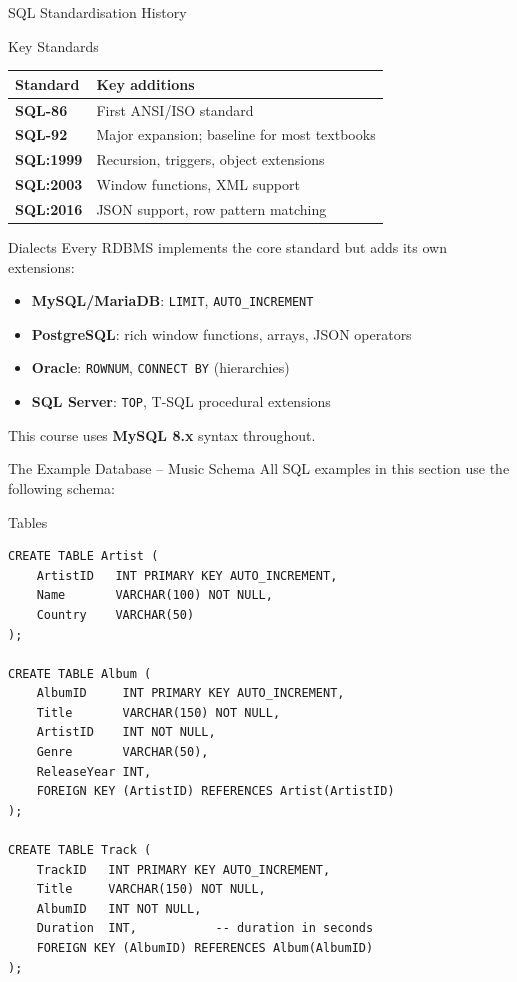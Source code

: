\begin{frame}{SQL Standardisation History}
  \begin{block}{Key Standards}
    \begin{tabular}{@{}ll@{}}
      \toprule
      \textbf{Standard} & \textbf{Key additions} \\
      \midrule
      \textbf{SQL-86}   & First ANSI/ISO standard \\
      \textbf{SQL-92}   & Major expansion; baseline for most textbooks \\
      \textbf{SQL:1999} & Recursion, triggers, object extensions \\
      \textbf{SQL:2003} & Window functions, XML support \\
      \textbf{SQL:2016} & JSON support, row pattern matching \\
      \bottomrule
    \end{tabular}
  \end{block}

  \begin{block}{Dialects}
    Every RDBMS implements the core standard but adds its own extensions:
    \begin{itemize}
      \item \textbf{MySQL/MariaDB}: \texttt{LIMIT}, \texttt{AUTO\_INCREMENT}
      \item \textbf{PostgreSQL}: rich window functions, arrays, JSON operators
      \item \textbf{Oracle}: \texttt{ROWNUM}, \texttt{CONNECT BY} (hierarchies)
      \item \textbf{SQL Server}: \texttt{TOP}, T-SQL procedural extensions
    \end{itemize}
    This course uses \textbf{MySQL 8.x} syntax throughout.
  \end{block}
\end{frame}

\begin{frame}[fragile]{The Example Database -- Music Schema}
  All SQL examples in this section use the following schema:

  \begin{block}{Tables}
\begin{lstlisting}[style=sqlstyle]
CREATE TABLE Artist (
    ArtistID   INT PRIMARY KEY AUTO_INCREMENT,
    Name       VARCHAR(100) NOT NULL,
    Country    VARCHAR(50)
);

CREATE TABLE Album (
    AlbumID     INT PRIMARY KEY AUTO_INCREMENT,
    Title       VARCHAR(150) NOT NULL,
    ArtistID    INT NOT NULL,
    Genre       VARCHAR(50),
    ReleaseYear INT,
    FOREIGN KEY (ArtistID) REFERENCES Artist(ArtistID)
);

CREATE TABLE Track (
    TrackID   INT PRIMARY KEY AUTO_INCREMENT,
    Title     VARCHAR(150) NOT NULL,
    AlbumID   INT NOT NULL,
    Duration  INT,           -- duration in seconds
    FOREIGN KEY (AlbumID) REFERENCES Album(AlbumID)
);
\end{lstlisting}
  \end{block}
\end{frame}

